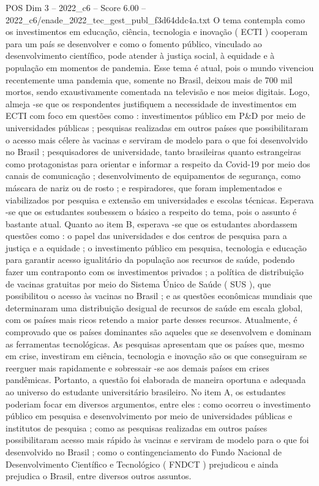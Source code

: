 \begin{textsample}{POS Dim 3 – 2022\_c6 – Score 6.00 – 2022\_c6/enade\_2022\_tec\_gest\_publ\_f3d64ddc4a.txt}
O tema contempla como os investimentos em educação, ciência, tecnologia e inovação ( ECTI ) cooperam para um país se desenvolver e como o fomento público, vinculado ao desenvolvimento científico, pode atender à justiça social, à equidade e à população em momentos de pandemia.
Esse tema é atual, pois o mundo vivenciou recentemente uma pandemia que, somente no Brasil, deixou mais de 700 mil mortos, sendo exaustivamente comentada na televisão e nos meios digitais.
Logo, almeja -se que os respondentes justifiquem a necessidade de investimentos em ECTI com foco em questões como : investimentos público em P\&D por meio de universidades públicas ; pesquisas realizadas em outros países que possibilitaram o acesso mais célere às vacinas e serviram de modelo para o que foi desenvolvido no Brasil ; pesquisadores de universidade, tanto brasileiras quanto estrangeiras como protagonistas para orientar e informar a respeito da Covid-19 por meio dos canais de comunicação ; desenvolvimento de equipamentos de segurança, como máscara de nariz ou de rosto ; e respiradores, que foram implementados e viabilizados por pesquisa e extensão em universidades e escolas técnicas.
Esperava -se que os estudantes soubessem o básico a respeito do tema, pois o assunto é bastante atual.
Quanto ao item B, esperava -se que os estudantes abordassem questões como : o papel das universidades e dos centros de pesquisa para a justiça e a equidade ; o investimento público em pesquisa, tecnologia e educação para garantir acesso igualitário da população aos recursos de saúde, podendo fazer um contraponto com os investimentos privados ; a política de distribuição de vacinas gratuitas por meio do Sistema Único de Saúde ( SUS ), que possibilitou o acesso às vacinas no Brasil ; e as questões econômicas mundiais que determinaram uma distribuição desigual de recursos de saúde em escala global, com os países mais ricos retendo a maior parte desses recursos.
Atualmente, é comprovado que os países dominantes são aqueles que se desenvolvem e dominam as ferramentas tecnológicas.
As pesquisas apresentam que os países que, mesmo em crise, investiram em ciência, tecnologia e inovação são os que conseguiram se reerguer mais rapidamente e sobressair -se aos demais países em crises pandêmicas.
Portanto, a questão foi elaborada de maneira oportuna e adequada ao universo do estudante universitário brasileiro.
No item A, os estudantes poderiam focar em diversos argumentos, entre eles : como ocorreu o investimento público em pesquisa e desenvolvimento por meio de universidades públicas e institutos de pesquisa ; como as pesquisas realizadas em outros países possibilitaram acesso mais rápido às vacinas e serviram de modelo para o que foi desenvolvido no Brasil ; como o contingenciamento do Fundo Nacional de Desenvolvimento Científico e Tecnológico ( FNDCT ) prejudicou e ainda prejudica o Brasil, entre diversos outros assuntos.

\end{textsample}

